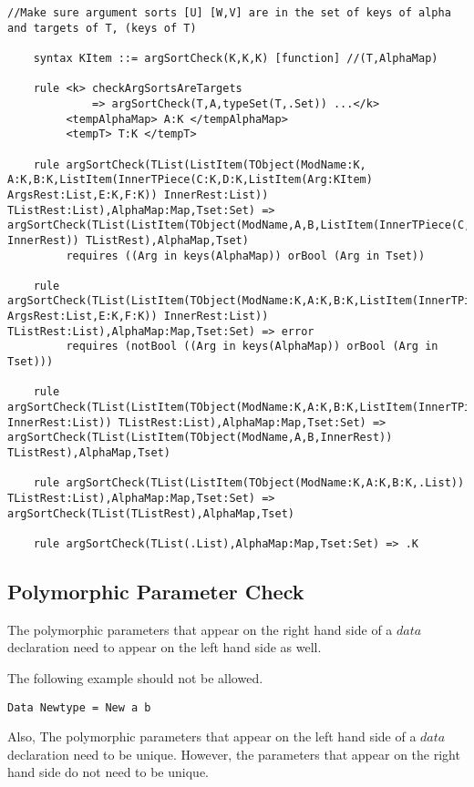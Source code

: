 \begin{lstlisting}
//Make sure argument sorts [U] [W,V] are in the set of keys of alpha and targets of T, (keys of T)

    syntax KItem ::= argSortCheck(K,K,K) [function] //(T,AlphaMap)

    rule <k> checkArgSortsAreTargets
             => argSortCheck(T,A,typeSet(T,.Set)) ...</k>
         <tempAlphaMap> A:K </tempAlphaMap>
         <tempT> T:K </tempT>
    
    rule argSortCheck(TList(ListItem(TObject(ModName:K, A:K,B:K,ListItem(InnerTPiece(C:K,D:K,ListItem(Arg:KItem) ArgsRest:List,E:K,F:K)) InnerRest:List)) TListRest:List),AlphaMap:Map,Tset:Set) => argSortCheck(TList(ListItem(TObject(ModName,A,B,ListItem(InnerTPiece(C,D,ArgsRest,E,F)) InnerRest)) TListRest),AlphaMap,Tset)
         requires ((Arg in keys(AlphaMap)) orBool (Arg in Tset))

    rule argSortCheck(TList(ListItem(TObject(ModName:K,A:K,B:K,ListItem(InnerTPiece(C:K,D:K,ListItem(Arg:KItem) ArgsRest:List,E:K,F:K)) InnerRest:List)) TListRest:List),AlphaMap:Map,Tset:Set) => error
         requires (notBool ((Arg in keys(AlphaMap)) orBool (Arg in Tset)))

    rule argSortCheck(TList(ListItem(TObject(ModName:K,A:K,B:K,ListItem(InnerTPiece(C:K,D:K,.List,E:K,F:K)) InnerRest:List)) TListRest:List),AlphaMap:Map,Tset:Set) => argSortCheck(TList(ListItem(TObject(ModName,A,B,InnerRest)) TListRest),AlphaMap,Tset)

    rule argSortCheck(TList(ListItem(TObject(ModName:K,A:K,B:K,.List)) TListRest:List),AlphaMap:Map,Tset:Set) => argSortCheck(TList(TListRest),AlphaMap,Tset)

    rule argSortCheck(TList(.List),AlphaMap:Map,Tset:Set) => .K
\end{lstlisting}

\subsection{Polymorphic Parameter Check}

The polymorphic parameters that appear on the right hand side of a $data$ declaration need to appear on the left hand side as well.

The following example should not be allowed.
\begin{lstlisting}
Data Newtype = New a b
\end{lstlisting}

Also, The polymorphic parameters that appear on the left hand side of a $data$ declaration need to be unique. However, the parameters that appear on the right hand side do not need to be unique.

